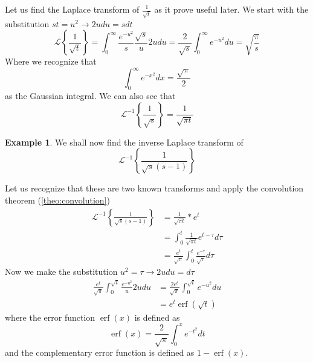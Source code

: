 \documentclass{report}
\theoremstyle{definition}
\newtheorem{example}[theorem]{Example}
\theoremstyle{remark}
\newcommand{\lapt}[1]{\mathscr{L}\left\{ #1\right\}}
\newcommand{\inlt}[1]{\mathscr{L}^{-1} \left\{ #1 \right\}}
\begin{document}
Let us find the Laplace transform of $\frac{1}{\sqrt t}$ as it prove useful later. We start with the substitution $st=u^2 \rightarrow2udu=sdt$
\begin{equation*}
    \lapt{\frac{1}{\sqrt t}} =\int^\infty_0\frac{e^{-u^2}}{s}\frac{\sqrt s}{u}2udu = \frac{2}{\sqrt s}\int^\infty_0e^{-u^2}du = \sqrt{\frac{\pi}{s}}
\end{equation*}
Where we recognize that 
\begin{equation*}
    \int^\infty_0e^{-x^2}dx = \frac{\sqrt \pi}{2}
\end{equation*}
as the Gaussian integral. We can also see that 
\begin{equation*}
    \inlt{\frac{1}{\sqrt s}} = \frac{1}{\sqrt{\pi t}}
\end{equation*}
\begin{example}
    We shall now find the inverse Laplace transform of
    \begin{equation*}
        \inlt{\frac{1}{\sqrt{s}(s-1)}}
    \end{equation*}
\end{example}
Let us recognize that these are two known transforms and apply the convolution theorem (\ref{theo:convolution})
\begin{equation*}
    \begin{split}
        \inlt{\frac{1}{\sqrt{s}(s-1)}} &= \frac{1}{\sqrt{\pi t}}*e^t\\
        &=\int^t_0 \frac{1}{\sqrt{\pi t}}e^{t-\tau}d\tau \\
        &=\frac{e^t}{\sqrt{\pi}}\int^t_0\frac{e^{-\tau}}{\sqrt{\tau}}d\tau 
    \end{split}
\end{equation*}
Now we make the substitution $u^2=\tau \rightarrow2udu=d\tau$
\begin{equation*}
    \begin{split}
        \frac{e^t}{\sqrt \pi} \int_{0}^{\sqrt{t}} \frac{e^{-u^2}}{u}2udu &= \frac{2e^t}{\sqrt \pi}\int_{0}^{\sqrt{t}} e^{-u^2}du\\
        &=e^t\operatorname{erf}\left(\sqrt t\right)
    \end{split}
\end{equation*}
where the error function $\operatorname{erf}\left( x \right)$ is defined as 
\begin{equation*}
    \operatorname{erf}(x) = \frac{2}{\sqrt \pi}\int^x_0e^{-t^2}dt
\end{equation*}
and the complementary error function is defined as $1-\operatorname{erf}(x)$. 
\end{document}
